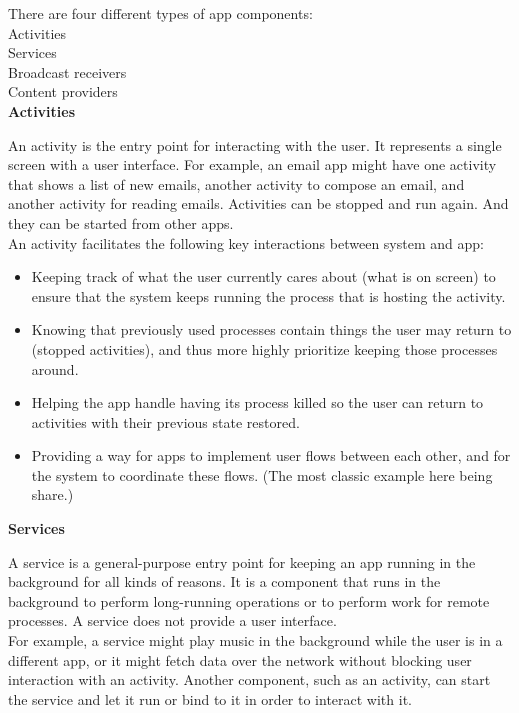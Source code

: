 \newpage    
There are four different types of app components:\\

    Activities\\
    Services\\
    Broadcast receivers\\
    Content providers\\

\textbf{Activities}

An activity is the entry point for interacting with the user. It represents a single screen with a user interface. For example, an email app might have one activity that shows a list of new emails, 
another activity to compose an email, and another activity for reading emails. Activities can be stopped and run again. And they can be started from other apps. \\

An activity facilitates the following key interactions between system and app:\\
\begin{itemize}
    \item Keeping track of what the user currently cares about (what is on screen) to ensure that the system keeps running the process that is hosting the activity.\\
    \item Knowing that previously used processes contain things the user may return to (stopped activities), and thus more highly prioritize keeping those processes around.\\
    \item Helping the app handle having its process killed so the user can return to activities with their previous state restored.\\
    \item Providing a way for apps to implement user flows between each other, and for the system to coordinate these flows. (The most classic example here being share.)\\
\end{itemize}

\textbf{Services}

A service is a general-purpose entry point for keeping an app running in the background for all kinds of reasons.
It is a component that runs in the background to perform long-running operations or to perform work for remote processes.
A service does not provide a user interface. \\

For example, a service might play music in the background while the user is in a different app, or it might fetch data over the network without blocking user interaction with an activity.
Another component, such as an activity, can start the service and let it run or bind to it in order to interact with it.\\

